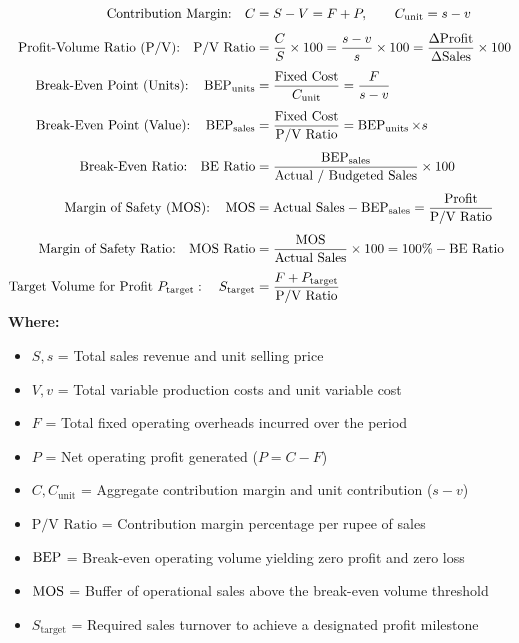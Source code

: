 \newpage
\begin{formulabox}
\begin{align*}
    \text{Contribution Margin:} \quad C &= S - V = F + P, \qquad C_{\text{unit}} = s - v \\[4pt]
    \text{Profit-Volume Ratio (P/V):} \quad \text{P/V Ratio} &= \frac{C}{S} \times 100 = \frac{s - v}{s} \times 100 = \frac{\Delta \text{Profit}}{\Delta \text{Sales}} \times 100 \\[4pt]
    \text{Break-Even Point (Units):} \quad \operatorname{BEP}_{\text{units}} &= \frac{\text{Fixed Cost}}{C_{\text{unit}}} = \frac{F}{s - v} \\[4pt]
    \text{Break-Even Point (Value):} \quad \operatorname{BEP}_{\text{sales}} &= \frac{\text{Fixed Cost}}{\text{P/V Ratio}} = \operatorname{BEP}_{\text{units}} \times s \\[4pt]
    \text{Break-Even Ratio:} \quad \text{BE Ratio} &= \frac{\operatorname{BEP}_{\text{sales}}}{\text{Actual / Budgeted Sales}} \times 100 \\[4pt]
    \text{Margin of Safety (MOS):} \quad \operatorname{MOS} &= \text{Actual Sales} - \operatorname{BEP}_{\text{sales}} = \frac{\text{Profit}}{\text{P/V Ratio}} \\[4pt]
    \text{Margin of Safety Ratio:} \quad \text{MOS Ratio} &= \frac{\operatorname{MOS}}{\text{Actual Sales}} \times 100 = 100\% - \text{BE Ratio} \\[4pt]
    \text{Target Volume for Profit } P_{\text{target}}: \quad S_{\text{target}} &= \frac{F + P_{\text{target}}}{\text{P/V Ratio}}
\end{align*}
\textbf{Where:}
\begin{itemize}[noitemsep, topsep=2pt]
    \item $S, s$ = Total sales revenue and unit selling price
    \item $V, v$ = Total variable production costs and unit variable cost
    \item $F$ = Total fixed operating overheads incurred over the period
    \item $P$ = Net operating profit generated ($P = C - F$)
    \item $C, C_{\text{unit}}$ = Aggregate contribution margin and unit contribution ($s - v$)
    \item $\text{P/V Ratio}$ = Contribution margin percentage per rupee of sales
    \item $\operatorname{BEP}$ = Break-even operating volume yielding zero profit and zero loss
    \item $\operatorname{MOS}$ = Buffer of operational sales above the break-even volume threshold
    \item $S_{\text{target}}$ = Required sales turnover to achieve a designated profit milestone
\end{itemize}
\end{formulabox}

